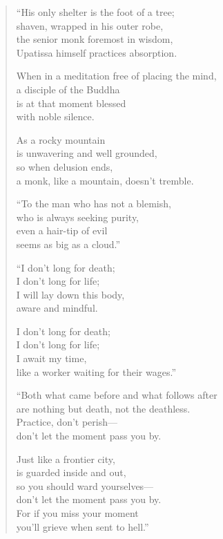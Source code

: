 \documentclass[12pt,openany]{book}%
\begin{document}
\begin{verse}
“His only shelter is the foot of a tree; \\
shaven, wrapped in his outer robe, \\
the senior monk foremost in wisdom, \\
Upatissa himself practices absorption. 

When in a meditation  free of placing the mind, \\
a disciple of the Buddha \\
is at that moment blessed \\
with noble silence. 

As a rocky mountain \\
is unwavering and well grounded, \\
so when delusion ends, \\
a monk, like a mountain, doesn’t tremble. 

“To the man who has not a blemish, \\
who is always seeking purity, \\
even a hair-tip of evil \\
seems as big as a cloud.” 

“I don’t long for death; \\
I don’t long for life; \\
I will lay down this body, \\
aware and mindful. 

I don’t long for death; \\
I don’t long for life; \\
I await my time, \\
like a worker waiting for their wages.” 

“Both what came before and what follows after \\
are nothing but death, not the deathless. \\
Practice, don’t perish—\\
don’t let the moment pass you by. 

Just like a frontier city, \\
is guarded inside and out, \\
so you should ward yourselves—\\
don’t let the moment pass you by. \\
For if you miss your moment \\
you’ll grieve when sent to hell.” 


\end{verse}
\end{document}
